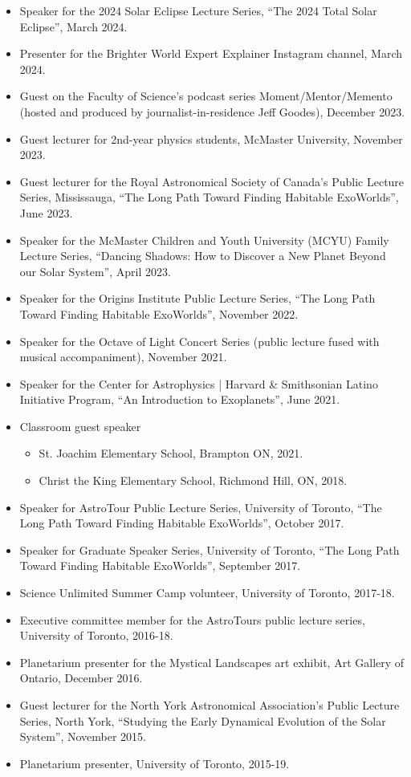 \documentclass[12pt]{article}
\begin{document}
\begin{itemize}[noitemsep]
\item Speaker for the 2024 Solar Eclipse Lecture Series, ``The 2024 Total Solar Eclipse'', March 2024.
\item Presenter for the Brighter World Expert Explainer Instagram channel, March 2024.
\item Guest on the Faculty of Science’s podcast series Moment/Mentor/Memento (hosted and produced by journalist-in-residence Jeff Goodes), December 2023.
\item Guest lecturer for 2nd-year physics students, McMaster University, November 2023.
\item Guest lecturer for the Royal Astronomical Society of Canada's Public Lecture Series, Mississauga, ``The Long Path Toward Finding Habitable ExoWorlds'', June 2023.
\item Speaker for the McMaster Children and Youth University (MCYU) Family Lecture Series, ``Dancing Shadows: How to Discover a New Planet Beyond our Solar System'', April 2023.
\item Speaker for the Origins Institute Public Lecture Series, ``The Long Path Toward Finding Habitable ExoWorlds'', November 2022.
\item Speaker for the Octave of Light Concert Series (public lecture fused with musical accompaniment), November 2021.
\item Speaker for the Center for Astrophysics | Harvard \& Smithsonian Latino Initiative Program, ``An Introduction to Exoplanets'', June 2021.

\item Classroom guest speaker
\begin{itemize}[noitemsep]
\item St. Joachim Elementary School, Brampton ON, 2021.
\item Christ the King Elementary School, Richmond Hill, ON, 2018.
\end{itemize}

\item Speaker for AstroTour Public Lecture Series, University of Toronto, ``The Long Path Toward Finding Habitable ExoWorlds'', October 2017.
\item Speaker for Graduate Speaker Series, University of Toronto, ``The Long Path Toward Finding Habitable ExoWorlds'', September 2017.
\item Science Unlimited Summer Camp volunteer, University of Toronto, 2017-18. 
\item Executive committee member for the AstroTours public lecture series, University of Toronto, 2016-18.
\item Planetarium presenter for the Mystical Landscapes art exhibit, Art Gallery of Ontario, December 2016.
\item Guest lecturer for the North York Astronomical Association's Public Lecture Series, North York, ``Studying the Early Dynamical Evolution of the Solar System'', November 2015.
\item Planetarium presenter, University of Toronto, 2015-19.

\end{itemize}

\vspace{0.5cm}

\end{document}
